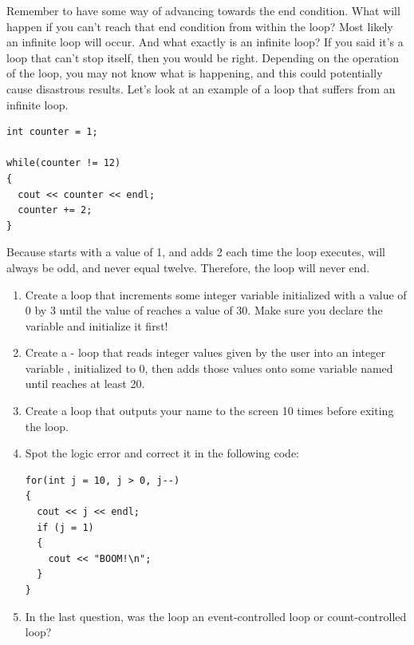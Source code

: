 
Remember to have some way of advancing towards the end condition.
What will happen if you can't reach that end condition from within the loop?
Most likely an infinite loop will occur. And what exactly is an infinite loop?
If you said it's a loop that can't stop itself, then you would be right.
Depending on the operation of the loop, you may not know what is happening, and this could potentially cause disastrous results.
Let's look at an example of a  loop that suffers from an infinite loop.

\noindent\begin{minipage}{\linewidth}\begin{lstlisting}
int counter = 1;

while(counter != 12)
{
  cout << counter << endl;
  counter += 2;
}
\end{lstlisting}\end{minipage}

Because  starts with a value of 1, and adds 2 each time the loop executes,  will always be odd, and never equal twelve.
Therefore, the loop will never end.

\begin{enumerate}
\item Create a  loop that increments some integer variable  initialized with a value of 0 by 3 until the value of  reaches a value of 30.
Make sure you declare the variable and initialize it first! 

\item  Create a - loop that reads integer values given by the user into an integer variable , initialized to 0, then adds those values onto some variable named  until  reaches at least 20.

\item Create a  loop that outputs your name to the screen 10 times before exiting the loop.

\item Spot the logic error and correct it in the following code:

\noindent\begin{minipage}{\linewidth}\begin{lstlisting}
for(int j = 10, j > 0, j--)
{
  cout << j << endl;
  if (j = 1)
  {
    cout << "BOOM!\n";
  }
}
\end{lstlisting}\end{minipage}

\item In the last question, was the loop an event-controlled loop or count-controlled loop?
\end{enumerate}


